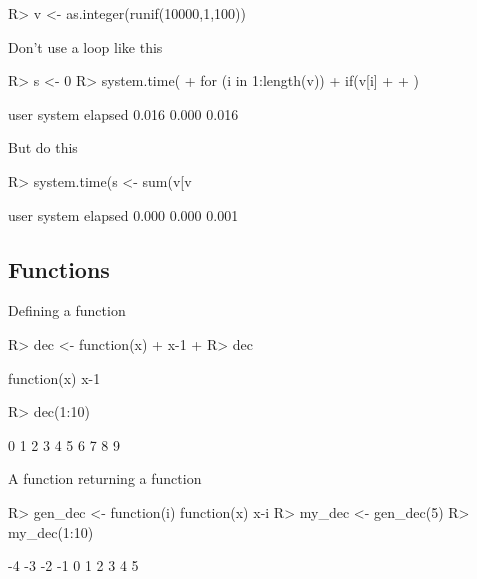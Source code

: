 \documentclass[fleqn, letter, 10pt]{article}
\begin{document}
\begin{Schunk}
\begin{Sinput}
R> v <- as.integer(runif(10000,1,100))
\end{Sinput}
\end{Schunk}

Don't use a loop like this
\begin{Schunk}
\begin{Sinput}
R> s <- 0
R> system.time(
+ for (i in 1:length(v)) {
+     if(v[i]%%3==0) s <- s+v[i]
+     }
+     )
\end{Sinput}
\begin{Soutput}
   user  system elapsed 
  0.016   0.000   0.016 
\end{Soutput}
\end{Schunk}


But do this
\begin{Schunk}
\begin{Sinput}
R> system.time(s <- sum(v[v%%3==0]))
\end{Sinput}
\begin{Soutput}
   user  system elapsed 
  0.000   0.000   0.001 
\end{Soutput}
\end{Schunk}


\subsection{Functions}

Defining a function
\begin{Schunk}
\begin{Sinput}
R> dec <- function(x) { 
+     x-1 
+ }
R> dec
\end{Sinput}
\begin{Soutput}
function(x) { 
    x-1 
}
\end{Soutput}
\begin{Sinput}
R> dec(1:10)
\end{Sinput}
\begin{Soutput}
 [1] 0 1 2 3 4 5 6 7 8 9
\end{Soutput}
\end{Schunk}

A function returning a function

\begin{Schunk}
\begin{Sinput}
R> gen_dec <- function(i) { function(x) {x-i} }
R> my_dec <- gen_dec(5)
R> my_dec(1:10)
\end{Sinput}
\begin{Soutput}
 [1] -4 -3 -2 -1  0  1  2  3  4  5
\end{Soutput}
\end{Schunk}
\end{document}
